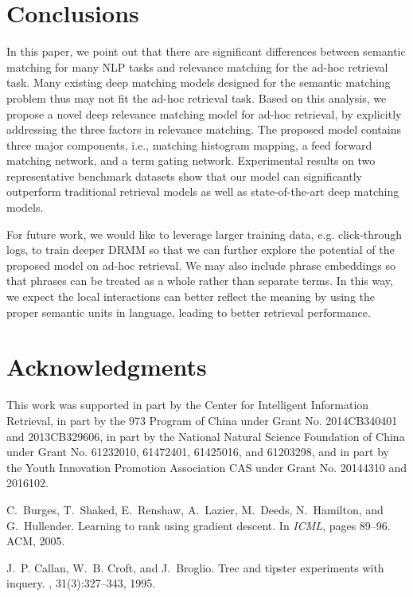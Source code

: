 \documentclass{sig-alternate-05-2015}
\begin{document}
{\section{Conclusions}
In this paper, we point out that there are significant differences between semantic matching for many NLP tasks and relevance matching for the ad-hoc retrieval task. Many existing deep matching models designed for the semantic matching problem thus may not fit the ad-hoc retrieval task. Based on this analysis, we propose a novel deep relevance matching model for ad-hoc retrieval, by explicitly addressing the three factors in relevance matching. The proposed model contains three major components, i.e., matching histogram mapping, a feed forward matching network, and a term gating network. Experimental results on two representative benchmark datasets show that our model can significantly outperform traditional retrieval models as well as state-of-the-art deep matching models.

For future work, we would like to leverage larger training data, e.g. click-through logs, to train deeper DRMM so that we can further explore the potential of the proposed model on ad-hoc retrieval. We may also include phrase embeddings so that phrases can be treated as a whole rather than separate terms. In this way, we expect the local interactions can better reflect the meaning by using the proper semantic units in language, leading to better retrieval performance.


\section{Acknowledgments}
This work was supported in part by the Center for Intelligent Information Retrieval, in part by the 973 Program of China under Grant No. 2014CB340401 and 2013CB329606, in part by the National Natural Science Foundation of China under Grant No. 61232010, 61472401, 61425016, and 61203298, and in part by the Youth Innovation Promotion Association CAS under Grant No. 20144310 and 2016102.



\begin{thebibliography}{10}

C.~Burges, T.~Shaked, E.~Renshaw, A.~Lazier, M.~Deeds, N.~Hamilton, and
  G.~Hullender.
\newblock Learning to rank using gradient descent.
\newblock In {\em ICML}, pages 89--96. ACM, 2005.

J.~P. Callan, W.~B. Croft, and J.~Broglio.
\newblock Trec and tipster experiments with inquery.
, 31(3):327--343, 1995.


\end{thebibliography}}
\end{document}
